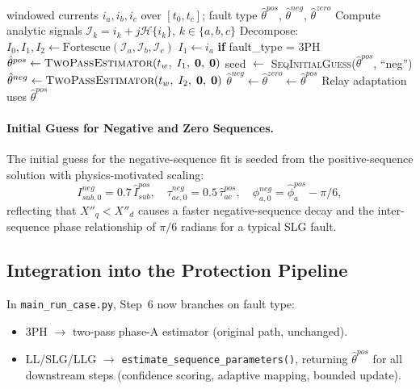 \documentclass[12pt,a4paper]{article}
\theoremstyle{definition}
\theoremstyle{plain}
\begin{document}
\begin{algorithm}[H]
\caption{Sequence-Component Inverse Estimation}
\label{alg:seqest}
\begin{algorithmic}[1]
\Require windowed currents $i_a, i_b, i_c$ over $[t_0, t_c]$; fault type
\Ensure $\hat{\theta}^{pos}$, $\hat{\theta}^{neg}$, $\hat{\theta}^{zero}$
\State Compute analytic signals $\mathcal{I}_k = i_k + j\mathcal{H}\{i_k\}$,\; $k \in \{a,b,c\}$
\State Decompose: $I_0, I_1, I_2 \gets \text{Fortescue}(\mathcal{I}_a, \mathcal{I}_b, \mathcal{I}_c)$
\State $I_1 \gets i_a$ \textbf{if} fault\_type = 3PH 
\State $\hat{\theta}^{pos} \gets \textsc{TwoPassEstimator}(t_w,\; I_1,\; \mathbf{0},\; \mathbf{0})$
  \State seed $\gets$ \textsc{SeqInitialGuess}($\hat{\theta}^{pos}$, ``neg'')
  \State $\hat{\theta}^{neg} \gets \textsc{TwoPassEstimator}(t_w,\; I_2,\; \mathbf{0},\; \mathbf{0})$
\EndIf
{}
  \State $\hat{\theta}^{neg} \gets \hat{\theta}^{zero} \gets \hat{\theta}^{pos}$ 
\EndIf
\State Relay adaptation uses $\hat{\theta}^{pos}$ 
\end{algorithmic}
\end{algorithm}

\paragraph{Initial Guess for Negative and Zero Sequences.}
The initial guess for the negative-sequence fit is seeded from the
positive-sequence solution with physics-motivated scaling:
\begin{equation}
  I^{neg}_{sub,0} = 0.7\,\hat{I}^{pos}_{sub},\quad
  \tau^{neg}_{ac,0} = 0.5\,\hat{\tau}^{pos}_{ac},\quad
  \phi^{neg}_{a,0}  = \hat{\phi}^{pos}_a - \pi/6,
  \label{eq:seqest:negseed}
\end{equation}
reflecting that $X''_q < X''_d$ causes a faster negative-sequence decay and
the inter-sequence phase relationship of $\pi/6$ radians for a typical SLG
fault.

\subsection{Integration into the Protection Pipeline}
\label{sec:seqest:pipeline}

In \texttt{main\_run\_case.py}, Step~6 now branches on fault type:
\begin{itemize}
  \item 3PH $\to$ two-pass phase-A estimator (original path, unchanged).
  \item LL/SLG/LLG $\to$ \texttt{estimate\_sequence\_parameters()},
        returning $\hat{\theta}^{pos}$ for all downstream steps (confidence
        scoring, adaptive mapping, bounded update).
\end{itemize}
\end{document}
